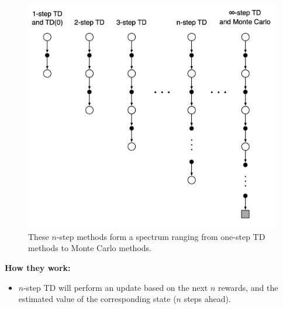 \documentclass[12pt, a4paper]{article}
\begin{document}
\begin{figure}[H]
  \centering
    \includegraphics[width=0.9\columnwidth]{images/n-step-methods.png}
    \caption{These $n$-step methods form a spectrum ranging from one-step TD methods to Monte Carlo methods.}
    \label{fig:n-step-methods}
\end{figure}


\textbf{How they work:}
\begin{itemize}
  \item $n$-step TD will perform an update based on the next $n$ rewards, and the estimated value of the corresponding state ($n$ steps ahead).
\end{itemize}
\end{document}
